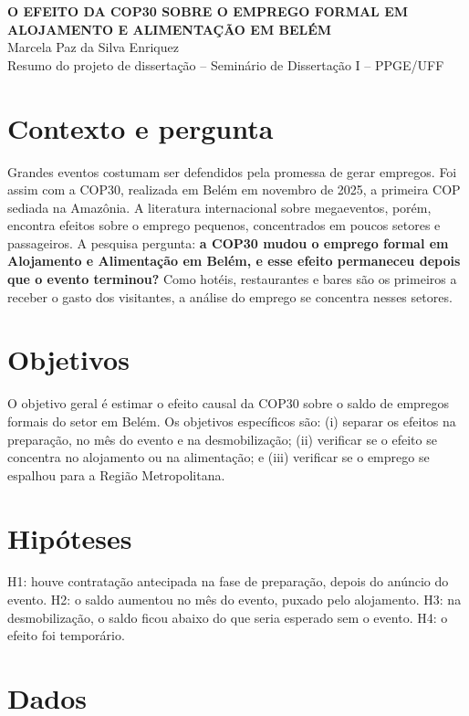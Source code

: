 \documentclass[12pt,a4paper]{article}
\begin{document}
\begin{center}
  {\bfseries O EFEITO DA COP30 SOBRE O EMPREGO FORMAL EM ALOJAMENTO E ALIMENTAÇÃO EM BELÉM}\\[4pt]
  Marcela Paz da Silva Enriquez\\
  Resumo do projeto de dissertação -- Seminário de Dissertação I -- PPGE/UFF
\end{center}

\section{Contexto e pergunta}

Grandes eventos costumam ser defendidos pela promessa de gerar empregos. Foi assim com a COP30,
realizada em Belém em novembro de 2025, a primeira COP sediada na Amazônia.
A literatura internacional sobre megaeventos, porém, encontra efeitos sobre o emprego pequenos,
concentrados em poucos setores e passageiros. A
pesquisa pergunta: \textbf{a COP30 mudou o emprego formal em Alojamento e Alimentação em Belém, e esse
efeito permaneceu depois que o evento terminou?} Como hotéis, restaurantes e bares são os primeiros a
receber o gasto dos visitantes, a análise do emprego se concentra nesses setores.

\section{Objetivos}

O objetivo geral é estimar o efeito causal da COP30 sobre o saldo de empregos formais do setor em
Belém. Os objetivos específicos são: (i) separar os efeitos na preparação, no mês do evento e na
desmobilização; (ii) verificar se o efeito se concentra no alojamento ou na alimentação; e (iii)
verificar se o emprego se espalhou para a Região Metropolitana.

\section{Hipóteses}

H1: houve contratação antecipada na fase de preparação, depois do anúncio do evento. H2: o saldo
aumentou no mês do evento, puxado pelo alojamento. H3: na desmobilização, o saldo ficou abaixo do
que seria esperado sem o evento. H4: o efeito foi temporário.

\section{Dados}
\end{document}
